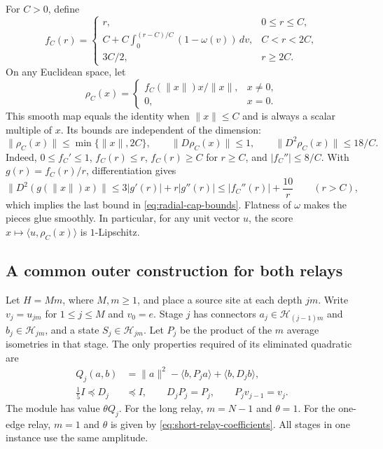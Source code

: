 \documentclass[11pt,letterpaper]{article}
\theoremstyle{definition}
\theoremstyle{remark}
\begin{document}
For $C>0$, define
\[
 f_C(r)=
 \begin{cases}
 r,&0\le r\le C,\\
 \displaystyle C+C\int_0^{(r-C)/C}(1-\omega(v))\,dv,
     &C<r<2C,\\
 3C/2,&r\ge2C.
 \end{cases}
\]
On any Euclidean space, let
\begin{equation}
 \rho_C(x)=
 \begin{cases}
 f_C(\|x\|)x/\|x\|,&x\ne0,\\
 0,&x=0.
 \end{cases}
 \label{eq:radial-cap}
\end{equation}
This smooth map equals the identity when $\|x\|\le C$ and is always a
scalar multiple of $x$.  Its bounds are independent of the dimension:
\begin{equation}
 \|\rho_C(x)\|\le\min\{\|x\|,2C\},\qquad
 \|D\rho_C(x)\|\le1,\qquad
 \|D^2\rho_C(x)\|\le18/C.
 \label{eq:radial-cap-bounds}
\end{equation}
Indeed, $0\le f_C'\le1$, $f_C(r)\le r$, $f_C(r)\ge C$ for $r\ge C$,
and $|f_C''|\le8/C$.  With $g(r)=f_C(r)/r$, differentiation gives
\[
 \|D^2(g(\|x\|)x)\|
 \le3|g'(r)|+r|g''(r)|
 \le|f_C''(r)|+\frac{10}r\qquad(r>C),
\]
which implies the last bound in \eqref{eq:radial-cap-bounds}.
Flatness of $\omega$ makes the pieces glue smoothly.
In particular, for any unit vector $u$, the score
$x\mapsto\langle u,\rho_C(x)\rangle$ is $1$-Lipschitz.

\subsection{A common outer construction for both relays}
\label{sec:outer-construction}

Let $H=Mm$, where $M,m\ge1$, and place a source site at each depth
$jm$.  Write $v_j=u_{jm}$ for $1\le j\le M$ and $v_0=e$.
Stage $j$ has connectors
$a_j\in\mathcal H_{(j-1)m}$ and $b_j\in\mathcal H_{jm}$,
and a state $S_j\in\mathcal H_{jm}$.
Let $P_j$ be the product of the $m$ average isometries in that stage.
The only properties required of its eliminated quadratic are
\begin{equation}
\begin{split}
 Q_j(a,b)&=\|a\|^2-\langle b,P_ja\rangle
                        +\langle b,D_jb\rangle,\\
 \frac15I\preceq D_j&\preceq I,\qquad D_jP_j=P_j,
 \qquad P_jv_{j-1}=v_j.
\end{split}
\label{eq:endpoint-geometry}
\end{equation}
The module has value $\theta Q_j$.
For the long relay, $m=N-1$ and $\theta=1$.
For the one-edge relay, $m=1$ and $\theta$ is given by
\eqref{eq:short-relay-coefficients}.
All stages in one instance use the same amplitude.
\end{document}
